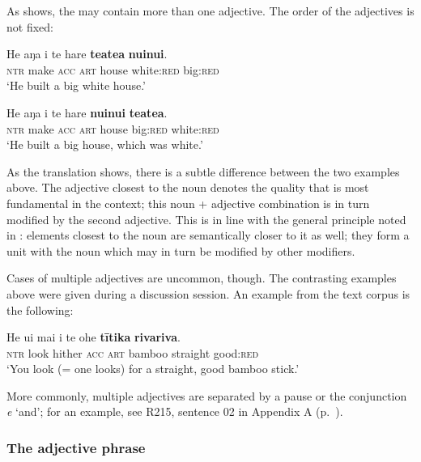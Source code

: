 As  shows, the  may contain more than one adjective. The order of the adjectives is not fixed:

\ea\label{ex:5.135}
\gll He aŋa i te hare \textbf{teatea} \textbf{nuinui}. \\
\textsc{ntr} make \textsc{acc} \textsc{art} house white:\textsc{red} big:\textsc{red} \\

\glt 
‘He built a big white house.’ \textstyleExampleref{[Notes]}
\z

\ea\label{ex:5.136}
\gll He aŋa i te hare \textbf{nuinui} \textbf{teatea}. \\
\textsc{ntr} make \textsc{acc} \textsc{art} house big:\textsc{red} white:\textsc{red} \\

\glt
‘He built a big house, which was white.’ \textstyleExampleref{[Notes]}
\z

As the translation shows, there is a subtle difference between the two examples above. The adjective closest to the noun denotes the quality that is most fundamental in the context; this noun + adjective combination is in turn modified by the second adjective. This is in line with the general principle noted in : elements closest to the noun are semantically closer to it as well; they form a unit with the noun which may in turn be modified by other modifiers.

Cases of multiple adjectives are uncommon, though. The contrasting examples above were given during a discussion session. An example from the text corpus is the following:

\ea\label{ex:5.137}
\gll He u{\ꞌ}i mai i te {\ꞌ}ohe \textbf{tītika} \textbf{rivariva}. \\
\textsc{ntr} look hither \textsc{acc} \textsc{art} bamboo straight good:\textsc{red} \\

\glt
‘You look (= one looks) for a straight, good bamboo stick.’ \textstyleExampleref{[R360.015]} 
\z

More commonly, multiple adjectives are separated by a pause or the conjunction \textit{{\ꞌ}e} ‘and’; for an example, see R215, sentence 02 in Appendix A (p.~\pageref{sec:a.1}).

\subsubsection[The adjective phrase]{The adjective phrase}\label{sec:5.7.3.2}

